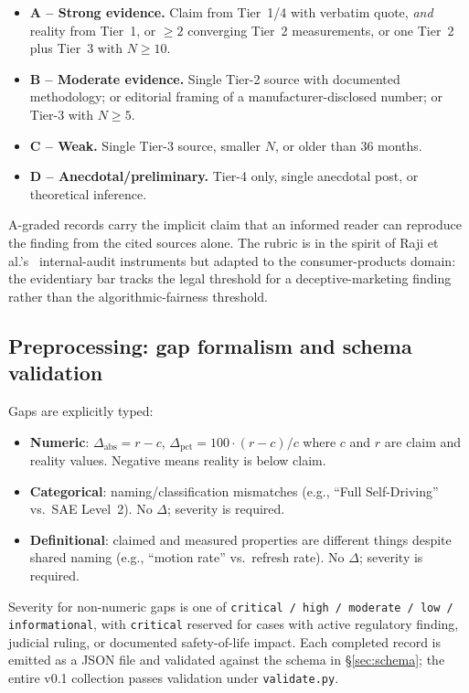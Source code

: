 \documentclass{article}
\begin{document}
\begin{itemize}
  \item \textbf{A -- Strong evidence.} Claim from Tier~1/4 with verbatim quote, \emph{and} reality from Tier~1, or $\geq 2$ converging Tier~2 measurements, or one Tier~2 plus Tier~3 with $N \geq 10$.
  \item \textbf{B -- Moderate evidence.} Single Tier-2 source with documented methodology; or editorial framing of a manufacturer-disclosed number; or Tier-3 with $N \geq 5$.
  \item \textbf{C -- Weak.} Single Tier-3 source, smaller $N$, or older than 36 months.
  \item \textbf{D -- Anecdotal/preliminary.} Tier-4 only, single anecdotal post, or theoretical inference.
\end{itemize}

A-graded records carry the implicit claim that an informed reader can reproduce the finding from the cited sources alone. The rubric is in the spirit of Raji et al.'s~\cite{raji_accountability_2020} internal-audit instruments but adapted to the consumer-products domain: the evidentiary bar tracks the legal threshold for a deceptive-marketing finding rather than the algorithmic-fairness threshold.

\FloatBarrier
\subsection{Preprocessing: gap formalism and schema validation}\label{sec:gap}

Gaps are explicitly typed:

\begin{itemize}
  \item \textbf{Numeric}: $\Delta_\text{abs} = r - c$, $\Delta_\text{pct} = 100 \cdot (r-c)/c$ where $c$ and $r$ are claim and reality values. Negative means reality is below claim.
  \item \textbf{Categorical}: naming/classification mismatches (e.g., ``Full Self-Driving'' vs.\ SAE Level~2). No $\Delta$; severity is required.
  \item \textbf{Definitional}: claimed and measured properties are different things despite shared naming (e.g., ``motion rate'' vs.\ refresh rate). No $\Delta$; severity is required.
\end{itemize}

Severity for non-numeric gaps is one of \texttt{critical / high / moderate / low / informational}, with \texttt{critical} reserved for cases with active regulatory finding, judicial ruling, or documented safety-of-life impact. Each completed record is emitted as a JSON file and validated against the schema in \S\ref{sec:schema}; the entire v0.1 collection passes validation under \texttt{validate.py}.
\end{document}
